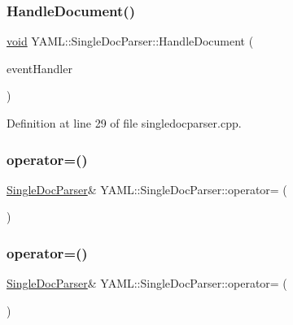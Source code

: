 \subsubsection{\texorpdfstring{HandleDocument()}{HandleDocument()}}
{\footnotesize\ttfamily \mbox{\hyperlink{glad_8h_a950fc91edb4504f62f1c577bf4727c29}{void}} Y\+A\+M\+L\+::\+Single\+Doc\+Parser\+::\+Handle\+Document (\begin{DoxyParamCaption}\item[{\mbox{\hyperlink{class_y_a_m_l_1_1_event_handler}{Event\+Handler}} \&}]{event\+Handler }\end{DoxyParamCaption})}



Definition at line 29 of file singledocparser.\+cpp.

\mbox{\label{class_y_a_m_l_1_1_single_doc_parser_a74478f9f1156fd5ef1ce2db63387cb45}} 
\subsubsection{\texorpdfstring{operator=()}{operator=()}\hspace{0.1cm}{\footnotesize\ttfamily [1/2]}}
{\footnotesize\ttfamily \mbox{\hyperlink{class_y_a_m_l_1_1_single_doc_parser}{Single\+Doc\+Parser}}\& Y\+A\+M\+L\+::\+Single\+Doc\+Parser\+::operator= (\begin{DoxyParamCaption}\item[{const \mbox{\hyperlink{class_y_a_m_l_1_1_single_doc_parser}{Single\+Doc\+Parser}} \&}]{ }\end{DoxyParamCaption})\hspace{0.3cm}{\ttfamily [delete]}}

\mbox{\label{class_y_a_m_l_1_1_single_doc_parser_aabbc063f47534f963a5c708ce4a667cf}} 
\subsubsection{\texorpdfstring{operator=()}{operator=()}\hspace{0.1cm}{\footnotesize\ttfamily [2/2]}}
{\footnotesize\ttfamily \mbox{\hyperlink{class_y_a_m_l_1_1_single_doc_parser}{Single\+Doc\+Parser}}\& Y\+A\+M\+L\+::\+Single\+Doc\+Parser\+::operator= (\begin{DoxyParamCaption}\item[{\mbox{\hyperlink{class_y_a_m_l_1_1_single_doc_parser}{Single\+Doc\+Parser}} \&\&}]{ }\end{DoxyParamCaption})\hspace{0.3cm}{\ttfamily [delete]}}



